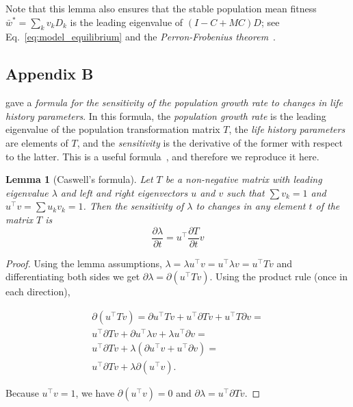 \documentclass[9pt, a4paper, twocolumn]{extarticle}
\newcommand*{\tr}{^\intercal}
\newtheorem{lemma}{Lemma}
\begin{document}
Note that this lemma also ensures that the stable population mean fitness $\bar{w}^*=\sum_k{v_k D_k}$ is the leading eigenvalue of $(I - C + M C) D$; see Eq.~\ref{eq:model_equilibrium} and the \emph{Perron-Frobenius theorem}~\cite[Appendix~A]{Otto2007}.

\subsection*{Appendix B}\label{sec:AppB}

\citet{Caswell1978} gave a \emph{formula for the sensitivity of the population growth rate to changes in life history parameters}.
In this formula, the \emph{population growth rate} is the leading eigenvalue of the population transformation matrix $T$, the \emph{life history parameters} are elements of $T$, and the \emph{sensitivity} is the derivative of the former with respect to the latter.
This is a useful formula~\citep{Caswell1978,Hermisson2002,Ram2012}, and therefore we reproduce it here.

\begin{lemma}[Caswell's formula]
Let $T$ be a non-negative matrix with leading eigenvalue $\lambda$ and left and right eigenvectors $u$ and $v$ such that $\sum{v_k}=1$ and $u\tr v = \sum{u_k v_k} = 1$.
Then the sensitivity of $\lambda$ to changes in any element $t$ of the matrix $T$ is
\begin{equation}\label{eq:Caswells_formula}
\frac{\partial \lambda}{\partial t} = 
u\tr \frac{\partial T}{\partial t} v
\end{equation}
\end{lemma}

\begin{proof} 
Using the lemma assumptions,
$\lambda = \lambda u\tr v = u\tr \lambda v = u\tr T v$ and differentiating both sides we get $\partial \lambda = \partial (u\tr T v)$.
Using the product rule (once in each direction),

\begin{multline}
\partial (u\tr T v) = 
\partial u\tr T v + u\tr \partial T v + u\tr T \partial v = \\
u\tr \partial T v + \partial u\tr \lambda v  + \lambda u\tr \partial v = \\
u\tr \partial T v + \lambda(\partial u\tr v  + u\tr \partial v) = \\
u\tr \partial T v + \lambda \partial(u\tr v).
\end{multline}

Because $u\tr v = 1$,
we have $\partial (u\tr v) = 0$ and
$\partial \lambda = u\tr \partial T v$.
\end{proof}
\end{document}
